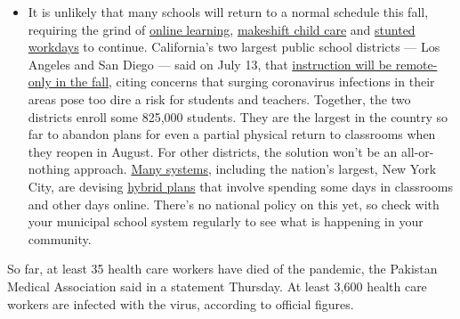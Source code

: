 \begin{itemize}
  \begin{itemize}
  \tightlist
  \item
    It is unlikely that many schools will return to a normal schedule
    this fall, requiring the grind of
    \href{https://www.nytimes.com/2020/06/05/us/coronavirus-education-lost-learning.html?action=click\&pgtype=Article\&state=default\&region=MAIN_CONTENT_3\&context=storylines_faq}{online
    learning},
    \href{https://www.nytimes.com/2020/05/29/us/coronavirus-child-care-centers.html?action=click\&pgtype=Article\&state=default\&region=MAIN_CONTENT_3\&context=storylines_faq}{makeshift
    child care} and
    \href{https://www.nytimes.com/2020/06/03/business/economy/coronavirus-working-women.html?action=click\&pgtype=Article\&state=default\&region=MAIN_CONTENT_3\&context=storylines_faq}{stunted
    workdays} to continue. California's two largest public school
    districts --- Los Angeles and San Diego --- said on July 13, that
    \href{https://www.nytimes.com/2020/07/13/us/lausd-san-diego-school-reopening.html?action=click\&pgtype=Article\&state=default\&region=MAIN_CONTENT_3\&context=storylines_faq}{instruction
    will be remote-only in the fall}, citing concerns that surging
    coronavirus infections in their areas pose too dire a risk for
    students and teachers. Together, the two districts enroll some
    825,000 students. They are the largest in the country so far to
    abandon plans for even a partial physical return to classrooms when
    they reopen in August. For other districts, the solution won't be an
    all-or-nothing approach.
    \href{https://bioethics.jhu.edu/research-and-outreach/projects/eschool-initiative/school-policy-tracker/}{Many
    systems}, including the nation's largest, New York City, are
    devising
    \href{https://www.nytimes.com/2020/06/26/us/coronavirus-schools-reopen-fall.html?action=click\&pgtype=Article\&state=default\&region=MAIN_CONTENT_3\&context=storylines_faq}{hybrid
    plans} that involve spending some days in classrooms and other days
    online. There's no national policy on this yet, so check with your
    municipal school system regularly to see what is happening in your
    community.
  \end{itemize}
\end{itemize}

So far, at least 35 health care workers have died of the pandemic, the
Pakistan Medical Association said in a statement Thursday. At least
3,600 health care workers are infected with the virus, according to
official figures.

